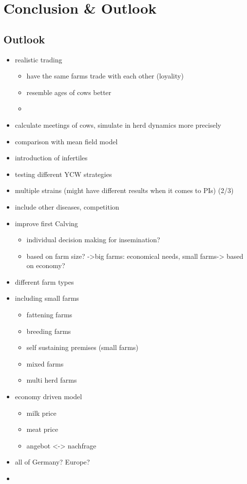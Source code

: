 \chapter{Conclusion \& Outlook}
\section{Outlook}
\begin{itemize}
\item realistic trading
\begin{itemize}
\item have the same farms trade with each other (loyality)
\item resemble ages of cows better
\item 
\end{itemize}
\item calculate meetings of cows, simulate in herd dynamics more precisely
\item comparison with mean field model
\item introduction of infertiles
\item testing different YCW strategies
\item multiple strains (might have different results when it comes to PIs) (2/3)
\item include other diseases, competition
\item improve first Calving 
\begin{itemize}
\item individual decision making for insemination? 
\item based on farm size? ->big farms: economical needs, small farms-> based on economy?
\end{itemize}
\item different farm types
\item including small farms
\begin{itemize}
\item fattening farms
\item breeding farms
\item self sustaining premises (small farms)
\item mixed farms
\item multi herd farms
\end{itemize}

\item economy driven model
\begin{itemize}
\item milk price
\item meat price
\item angebot <-> nachfrage
\end{itemize}
\item all of Germany? Europe?
\item 
\end{itemize}

